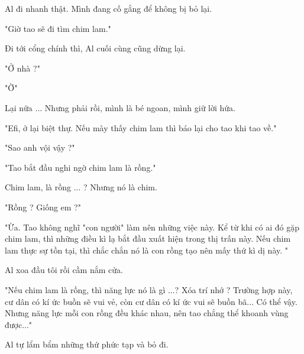 Al đi nhanh thật. Mình đang cố gắng để không bị bỏ lại.

"Giờ tao sẽ đi tìm chim lam."

Đi tới cổng chính thì, Al cuối cùng cũng dừng lại.

"Ở nhà ?"

"Ờ"

Lại nữa ... Nhưng phải rồi, mình là bé ngoan, mình giữ lời hứa.

"Efi, ở lại biệt thự. Nếu mày thấy chim lam thì báo lại cho tao khi tao về."

"Sao anh vội vậy ?"

"Tao bắt đầu nghi ngờ chim lam là rồng."

Chim lam, là rồng ... ? Nhưng nó là chim.

"Rồng ? Giống em ?"

"Ừa. Tao không nghĩ "con người" làm nên những việc này. Kể từ khi có ai đó gặp chim lam, thì những điều kì lạ bắt đầu xuất hiện trong thị trấn này. Nếu chim lam thực sự tồn tại, thì chắc chắn nó là con rồng tạo nên mấy thứ kì dị này. "

Al xoa đầu tôi rồi cầm nắm cửa.

"Nếu chim lam là rồng, thì năng lực nó là gì ...? Xóa trí nhớ ? Trường hợp này, cư dân có kí ức buồn sẽ vui vẻ, còn cư dân có kí ức vui sẽ buồn bã... Có thể vậy. Nhưng năng lực mỗi con rồng đều khác nhau, nên tao chẳng thể khoanh vùng được..."

Al tự lẩm bẩm những thứ phức tạp và bỏ đi.\\

